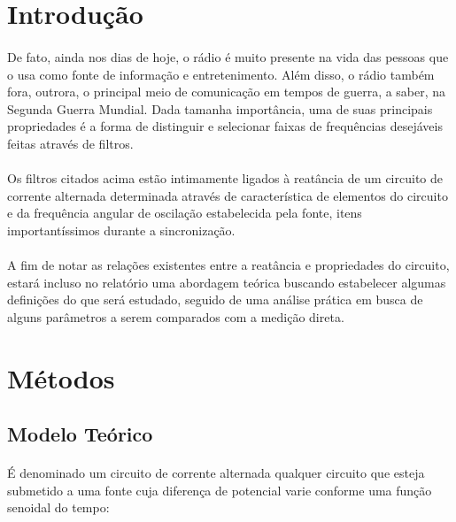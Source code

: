 \documentclass[a4paper, 12pt]{article}
\begin{document}
\begin{multicols}{2}
\section{Introdução}
\paragraph{} De fato, ainda nos dias de hoje, o rádio é muito presente na vida das pessoas que o usa como fonte de informação e entretenimento. Além disso, o rádio também fora, outrora, o principal meio de comunicação em tempos de guerra, a saber, na Segunda Guerra Mundial. Dada tamanha importância, uma de suas principais propriedades é a forma de distinguir e selecionar faixas de frequências desejáveis feitas através de filtros.

\paragraph{} Os filtros citados acima estão intimamente ligados à reatância de um circuito de corrente alternada determinada através de característica de elementos do circuito e da frequência angular de oscilação estabelecida pela fonte, itens importantíssimos durante a sincronização.  

\paragraph{} A fim de notar as relações existentes entre a reatância e propriedades do circuito, estará incluso no relatório uma abordagem teórica buscando estabelecer algumas definições do que será estudado, seguido de uma análise prática em busca de alguns parâmetros a serem comparados com a medição direta. 

\section{Métodos}
\subsection{Modelo Teórico}
\paragraph{} É denominado um circuito de corrente alternada qualquer circuito que esteja submetido a uma fonte cuja diferença de potencial varie conforme uma função senoidal do tempo:


\end{multicols}
\end{document}
